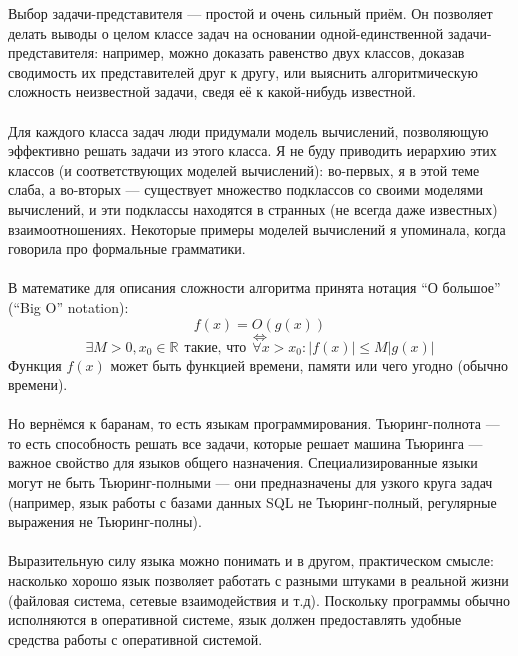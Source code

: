 \documentclass[11pt]{book}
\begin{document}
Выбор задачи-представителя --- простой и очень сильный приём.
Он позволяет делать выводы о целом классе задач на основании одной-единственной задачи-представителя:
например, можно доказать равенство двух классов, доказав сводимость их представителей друг к другу,
или выяснить алгоритмическую сложность неизвестной задачи, сведя её к какой-нибудь известной.
\\ \\
Для каждого класса задач люди придумали модель вычислений, позволяющую эффективно решать задачи из этого класса.
Я не буду приводить иерархию этих классов (и соответствующих моделей вычислений):
во-первых, я в этой теме слаба, а во-вторых --- существует множество подклассов со своими моделями вычислений,
и эти подклассы находятся в странных (не всегда даже известных) взаимоотношениях.
Некоторые примеры моделей вычислений я упоминала, когда говорила про формальные грамматики.
\\ \\
В математике для описания сложности алгоритма принята нотация ``О большое'' (``Big O'' notation):
$$f(x) = O(g(x))$$
$$\Leftrightarrow$$
$$\exists M>0, x_0 \in \mathbb{R} \ \ \text{такие, что}\ \  \forall x>x_0: |f(x)| \leq M |g(x)|$$
Функция $f(x)$ может быть функцией времени, памяти или чего угодно (обычно времени).
\\ \\
Но вернёмся к баранам, то есть языкам программирования.
Тьюринг-полнота --- то есть способность решать все задачи, которые решает машина Тьюринга ---
важное свойство для языков общего назначения.
Специализированные языки могут не быть Тьюринг-полными --- они предназначены для узкого круга задач
(например, язык работы с базами данных SQL не Тьюринг-полный, регулярные выражения не Тьюринг-полны).
\\ \\
Выразительную силу языка можно понимать и в другом, практическом смысле:
насколько хорошо язык позволяет работать с разными штуками в реальной жизни (файловая система, сетевые взаимодействия и т.д).
Поскольку программы обычно исполняются в оперативной системе, язык должен предоставлять удобные средства работы
с оперативной системой.
\end{document}
